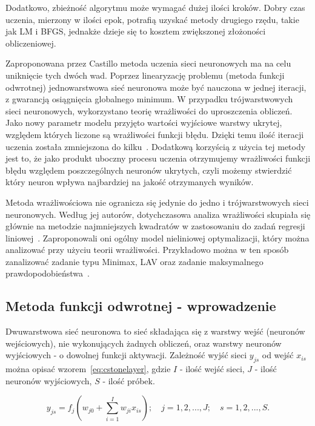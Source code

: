 \documentclass[11pt,a4paper]{article}
\begin{document}
Dodatkowo, zbieżność algorytmu może wymagać dużej ilości kroków. Dobry czas uczenia, mierzony w ilości epok, potrafią uzyskać metody drugiego rzędu, takie jak LM i BFGS, jednakże dzieje się to kosztem zwiększonej złożoności obliczeniowej.

Zaproponowana przez Castillo metoda uczenia sieci neuronowych ma na celu uniknięcie tych dwóch wad. Poprzez linearyzację problemu (metoda funkcji odwrotnej) jednowarstwowa sieć neuronowa może być nauczona w jednej iteracji, z gwarancją osiągnięcia globalnego minimum. W przypadku trójwarstwowych sieci neuronowych, wykorzystano teorię wrażliwości do uproszczenia obliczeń. Jako nowy parametr modelu przyjęto wartości wyjściowe warstwy ukrytej, względem których liczone są wrażliwości funkcji błędu. Dzięki temu ilość iteracji uczenia została zmniejszona do kilku~\cite{castillo2006very}. Dodatkową korzyścią z użycia tej metody jest to, że jako produkt uboczny procesu uczenia otrzymujemy wrażliwości funkcji błędu względem poszczególnych neuronów ukrytych, czyli możemy stwierdzić który neuron wpływa najbardziej na jakość otrzymanych wyników.

Metoda wrażliwościowa nie ogranicza się jedynie do jedno i trójwarstwowych sieci neuronowych. Według jej autorów, dotychczasowa analiza wrażliwości skupiała się głównie na metodzie najmniejszych kwadratów w zastosowaniu do zadań regresji liniowej~\cite{castillo2004general}. Zaproponowali oni ogólny model nieliniowej optymalizacji, który można analizować przy użyciu teorii wrażliwości. Przykładowo można w ten sposób zanalizować zadanie typu Minimax, LAV oraz zadanie maksymalnego prawdopodobieństwa~\cite{castillo2004general}.

\newpage

\subsection{Metoda funkcji odwrotnej - wprowadzenie}
Dwuwarstwowa sieć neuronowa to sieć składająca się z warstwy wejść (neuronów wejściowych), nie wykonujących żadnych obliczeń, oraz warstwy neuronów wyjściowych - o dowolnej funkcji aktywacji. Zależność wyjść sieci $y_{js}$ od wejść $x_{is}$ można opisać wzorem~\ref{eq:cstonelayer}, gdzie $I$ - ilość wejść sieci, $J$ - ilość neuronów wyjściowych, $S$ - ilość próbek.

\begin{equation}
y_{js} = f_j \left( w_{j0} + \sum_{i=1}^{I}w_{ji}x_{is} \right); \quad j = 1,2,...,J; \quad s = 1,2,...,S.
\label{eq:cstonelayer}
\end{equation}
\end{document}
